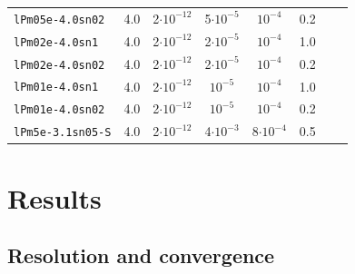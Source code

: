 \documentclass[preprint2]{aastex63}
\begin{document}
\begin{table}
\begin{tabular}{lccccccc}
\texttt{lPm05e-4.0sn02} & 4.0 & 2$\cdot10^{-12}$    & 5$\cdot10^{-5}$  &       $10^{-4}$ & 0.2  \\    
\texttt{lPm02e-4.0sn1}  & 4.0 & 2$\cdot10^{-12}$    & 2$\cdot10^{-5}$  &       $10^{-4}$ &  1.0 \\    
\texttt{lPm02e-4.0sn02} & 4.0 & 2$\cdot10^{-12}$    & 2$\cdot10^{-5}$  &       $10^{-4}$ & 0.2  \\    
\texttt{lPm01e-4.0sn1}  & 4.0 & 2$\cdot10^{-12}$    &       $10^{-5}$  &       $10^{-4}$ &  1.0 \\    
\texttt{lPm01e-4.0sn02} & 4.0 & 2$\cdot10^{-12}$    &       $10^{-5}$  &       $10^{-4}$ & 0.2  \\    
\texttt{lPm5e-3.1sn05-S}& 4.0 & 2$\cdot10^{-12}$    & 4$\cdot10^{-3}$  & 8$\cdot10^{-4}$ & 0.5      
\end{tabular}
\end{table}

\section{Results} \label{sec:results}

\subsection{{Resolution and convergence}} \label{sec:conv}
\end{document}
